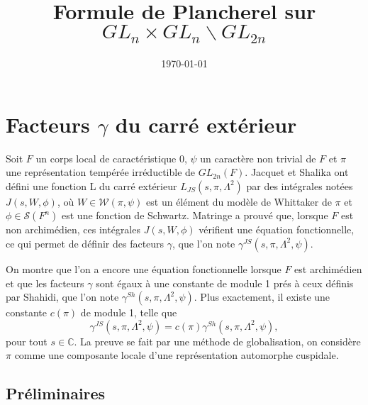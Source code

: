 \documentclass{amsart}
\begin{document}
\title{Formule de Plancherel sur $GL_n \times GL_n \backslash GL_{2n}$}
\date{\today}
\maketitle

\section{Facteurs $\gamma$ du carré extérieur}
Soit $F$ un corps local de caractéristique $0$, $\psi$ un caractère non trivial de $F$ et $\pi$ une représentation tempérée irréductible de $GL_{2n}(F)$. Jacquet et Shalika ont défini une fonction L du carré extérieur $L_{JS}(s, \pi, \Lambda^2)$ par des intégrales notées $J(s, W, \phi)$, où $W \in \mathcal{W}(\pi, \psi)$ est un élément du modèle de Whittaker de $\pi$ et $\phi \in \mathcal{S}(F^n)$ est une fonction de Schwartz. Matringe a prouvé que, lorsque $F$ est non archimédien, ces intégrales $J(s,W,\phi)$ vérifient une équation fonctionnelle, ce qui permet de définir des facteurs $\gamma$, que l'on note $\gamma^{JS}(s,\pi,\Lambda^2,\psi)$. 

On montre que l'on a encore une équation fonctionnelle lorsque $F$ est archimédien et que les facteurs $\gamma$ sont égaux à une constante de module 1 prés à ceux définis par Shahidi, que l'on note $\gamma^{Sh}(s,\pi,\Lambda^2,\psi)$. Plus exactement, il existe une constante $c(\pi)$ de module 1, telle que
\begin{equation}
\gamma^{JS}(s,\pi,\Lambda^2,\psi)=c(\pi)\gamma^{Sh}(s,\pi,\Lambda^2,\psi),
\end{equation}
pour tout $s \in \mathbb{C}$. La preuve se fait par une méthode de globalisation, on considère $\pi$ comme une composante locale d'une représentation automorphe cuspidale.

\subsection{Préliminaires}
\end{document}

